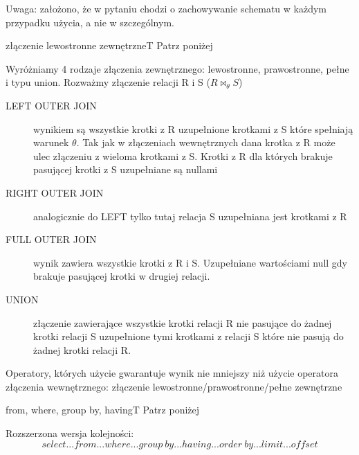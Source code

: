 \vspace{0.2cm}
\noindent
Uwaga: założono, że w pytaniu chodzi o zachowywanie schematu w każdym przypadku użycia, a nie w szczególnym.

{złączenie lewostronne zewnętrzne}{T}
{Patrz poniżej}
{\\}

\vspace{0.2cm}
\noindent
Wyróżniamy 4 rodzaje złączenia zewnętrznego: lewostronne, prawostronne, pełne i typu union. Rozważmy złączenie relacji R i S ($R \Join_{\theta} S$)
\begin{description}
	\item[LEFT OUTER JOIN] wynikiem są wszystkie krotki z R uzupełnione krotkami z S które spełniają warunek $\theta$. Tak jak w złączeniach wewnętrznych dana krotka z R może ulec złączeniu z wieloma krotkami z S. Krotki z R dla których brakuje pasującej krotki z S uzupełniane są nullami
    \item[RIGHT OUTER JOIN] analogicznie do LEFT tylko tutaj relacja S uzupełniana jest krotkami z R
    \item[FULL OUTER JOIN] wynik zawiera wszystkie krotki z R i S. Uzupełniane wartościami null gdy brakuje pasującej krotki w drugiej relacji.
    \item[UNION]  złączenie zawierające wszystkie krotki relacji R nie pasujące do żadnej krotki relacji S uzupełnione tymi krotkami z relacji S które nie pasują do żadnej krotki relacji R.
\end{description}

\vspace{0.2cm}
\noindent
Operatory, których użycie gwarantuje wynik nie mniejszy niż użycie operatora złączenia wewnętrznego: złączenie lewostronne/prawostronne/pełne zewnętrzne

{from, where, group by, having}{T}
{Patrz poniżej}
{\\}

\vspace{0.2cm}
\noindent
Rozszerzona wersja kolejności: 
$$
select ... from ... where ... group~by ... having ... order~by ... limit ... offset  
$$

